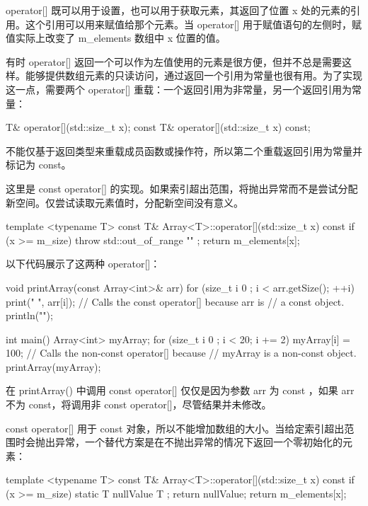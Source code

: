 operator[] 既可以用于设置，也可以用于获取元素，其返回了位置 x 处的元素的引用。这个引用可以用来赋值给那个元素。当 operator[] 用于赋值语句的左侧时，赋值实际上改变了 m\_elements 数组中 x 位置的值。


有时 operator[] 返回一个可以作为左值使用的元素是很方便，但并不总是需要这样。能够提供数组元素的只读访问，通过返回一个引用为常量也很有用。为了实现这一点，需要两个 operator[] 重载：一个返回引用为非常量，另一个返回引用为常量：

\begin{cpp}
T& operator[](std::size_t x);
const T& operator[](std::size_t x) const;
\end{cpp}

不能仅基于返回类型来重载成员函数或操作符，所以第二个重载返回引用为常量并标记为 const。

这里是 const operator[] 的实现。如果索引超出范围，将抛出异常而不是尝试分配新空间。仅尝试读取元素值时，分配新空间没有意义。

\begin{cpp}
template <typename T> const T& Array<T>::operator[](std::size_t x) const
{
    if (x >= m_size) { throw std::out_of_range { "" }; }
    return m_elements[x];
}
\end{cpp}

以下代码展示了这两种 operator[]：

\begin{cpp}
void printArray(const Array<int>& arr)
{
    for (size_t i { 0 }; i < arr.getSize(); ++i) {
        print("{} ", arr[i]); // Calls the const operator[] because arr is
                              // a const object.
    }
    println("");
}

int main()
{
    Array<int> myArray;
    for (size_t i { 0 }; i < 20; i += 2) {
        myArray[i] = 100; // Calls the non-const operator[] because
                          // myArray is a non-const object.
    }
    printArray(myArray);
}
\end{cpp}

在 printArray() 中调用 const operator[] 仅仅是因为参数 arr 为 const ，如果 arr 不为 const，将调用非 const operator[]，尽管结果并未修改。

const operator[] 用于 const 对象，所以不能增加数组的大小。当给定索引超出范围时会抛出异常，一个替代方案是在不抛出异常的情况下返回一个零初始化的元素：

\begin{cpp}
template <typename T> const T& Array<T>::operator[](std::size_t x) const
{
    if (x >= m_size) {
        static T nullValue { T{} };
        return nullValue;
    }
    return m_elements[x];
}
\end{cpp}

